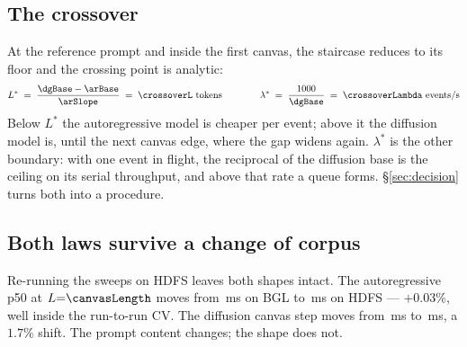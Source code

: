 \subsection{The crossover}

At the reference prompt and inside the first canvas, the staircase reduces to
its floor and the crossing point is analytic:
\begin{equation}
\label{eq:lcross}
L^{*} \;=\; \frac{\dgBase - \arBase}{\arSlope} \;=\; \crossoverL \ \text{tokens}
\qquad\qquad
\lambda^{*} \;=\; \frac{1000}{\dgBase} \;=\; \crossoverLambda \ \text{events/s}
\end{equation}
Below $L^{*}$ the autoregressive model is cheaper per event; above it the
diffusion model is, until the next canvas edge, where the gap widens again.
$\lambda^{*}$ is the other boundary: with one event in flight, the reciprocal
of the diffusion base is the ceiling on its serial throughput, and above that
rate a queue forms. \S\ref{sec:decision} turns both into a procedure.

\subsection{Both laws survive a change of corpus}

Re-running the sweeps on HDFS leaves both shapes intact. The autoregressive
p50 at $L{=}\canvasLength$ moves from \arBgl\,ms on BGL to \arHdfs\,ms on HDFS
--- $+0.03\%$, well inside the run-to-run CV. The diffusion canvas step moves
from \bglStep\,ms to \hdfsStep\,ms, a $1.7\%$ shift. The prompt content
changes; the shape does not.
